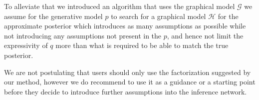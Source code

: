 \documentclass[12pt]{article}
\begin{document}
To alleviate that we introduced an algorithm that uses the graphical model $\mathcal{G}$ we assume for the generative model $p$ to search for a graphical model $\mathcal{H}$ for the approximate posterior which introduces as many assumptions as possible while not introducing any assumptions not present in the $p$, and hence not limit the expressivity of $q$ more than what is required to be able to match the true posterior.

We are not postulating that users should only use the factorization suggested by our method,
however we do recommend to use it as a guidance or a starting point before they decide to
introduce further assumptions into the inference network.



\end{document}

